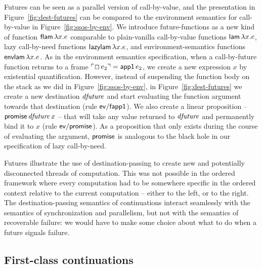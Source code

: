 Futures can be seen as a parallel version of call-by-value, and the
presentation in Figure~\ref{fig:dest-futures} can be compared to the
environment semantics for call-by-value in
Figure~\ref{fig:ssos-by-env}. We introduce future-functions as a new
kind of function ${\sf flam}\,\lambda x.e$ comparable to plain-vanilla
call-by-value functions ${\sf lam}\,\lambda x.e$, lazy call-by-need
functions ${\sf lazylam}\,\lambda x.e$, and environment-semantics
functions ${\sf envlam}\,\lambda x.e$. As in the environment semantics
specification, when a call-by-future function returns to a frame
${\ulcorner{\Box\,e_2}\urcorner} = {\sf app1}\,e_2$, we create a new expression $x$
by existential quantification. However, instead of suspending the
function body on the stack as we did in Figure~\ref{fig:ssos-by-env},
in Figure~\ref{fig:dest-futures} we create a new destination ${\it
  dfuture}$ and start evaluating the function argument towards that
destination (rule ${\sf ev/fapp1}$). We also create a linear
proposition -- ${\sf promise}\,{\it dfuture}\,x$ -- that will take
any value returned to ${\it dfuture}$ and permanently bind it to $x$
(rule ${\sf ev/promise}$). As a proposition that only exists during
the course of evaluating the argument, ${\sf promise}$ is analogous to
the black hole in our specification of lazy call-by-need.

Futures illustrate the use of destination-passing to create new and
potentially disconnected threads of computation. This was not possible
in the ordered framework where every computation had to be somewhere
specific in the ordered context relative to the current computation --
either to the left, or to the right. The destination-passing semantics
of continuations interact seamlessly with the semantics of
synchronization and parallelism, but not with the semantics of
recoverable failure: we would have to make some choice about what to 
do when a future signals failure.

\subsection{First-class continuations}
\label{sec:dest-continuations}

